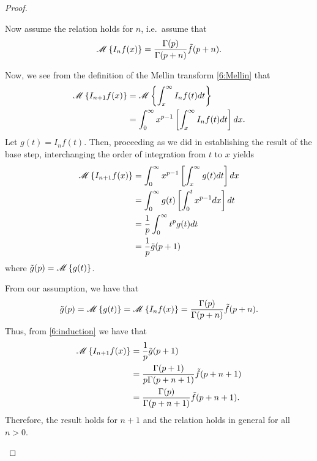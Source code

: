 \begin{proof}
\begin{enumerate}
      Now assume the relation holds for $n$, i.e.\ assume that
      \begin{align*}
        \mathscr{M}\left\{ {I_n f(x)} \right\} = \frac{\Gamma(p)}{\Gamma(p+n)} \tilde{f}(p + n).
      \end{align*}

      Now, we see from the definition of the Mellin transform \eqref{6:Mellin} that
      \begin{align*}
        \mathscr{M}\left\{ {I_{n+1} f(x)} \right\} &= \mathscr{M}\left\{ {\int_x^\infty I_n f(t) dt} \right\} \\
        &= \int_0^\infty x^{p-1} \left[\int_x^\infty I_n f(t) dt \right] dx.
      \end{align*}
      Let $g(t) = I_n f(t)$. Then, proceeding as we did in establishing the result of
      the base step, interchanging the order of integration
      from $t$ to $x$ yields
      \begin{align}
        \label{6:induction}
        \mathscr{M}\left\{ {I_{n+1} f(x)} \right\}
        &= \int_0^\infty x^{p-1} \left[\int_x^\infty g(t) dt \right] dx \notag \\
        &= \int_0^\infty g(t)  \left[\int_0^t x^{p-1}dx \right] dt \notag \\
        &= \frac{1}{p}\int_0^\infty t^p g(t)dt \notag \\
        &= \frac{1}{p}\tilde{g}(p + 1)
      \end{align}
      where $\tilde{g}(p) = \mathscr{M}\left\{ {g(t)} \right\}$.

      From our assumption, we have that
      \begin{align*}
        \tilde{g}(p) = \mathscr{M}\left\{ {g(t)} \right\} = \mathscr{M}\left\{ {I_n f(x)} \right\} = \frac{\Gamma(p)}{\Gamma(p+n)} \tilde{f}(p + n).
      \end{align*}
      Thus, from \eqref{6:induction} we have that
      \begin{align*}
        \mathscr{M}\left\{ {I_{n+1} f(x)} \right\}
        &= \frac{1}{p}\tilde{g}(p + 1) \\
        &= \frac{\Gamma(p+1)}{p\Gamma(p+n+1)} \tilde{f}(p + n + 1) \\
        &= \frac{\Gamma(p)}{\Gamma(p+n+1)} \tilde{f}(p + n + 1).
      \end{align*}
      Therefore, the result holds for $n+1$ and the relation holds in general for all $n > 0$.

  \end{enumerate}
\end{proof}
\newpage
